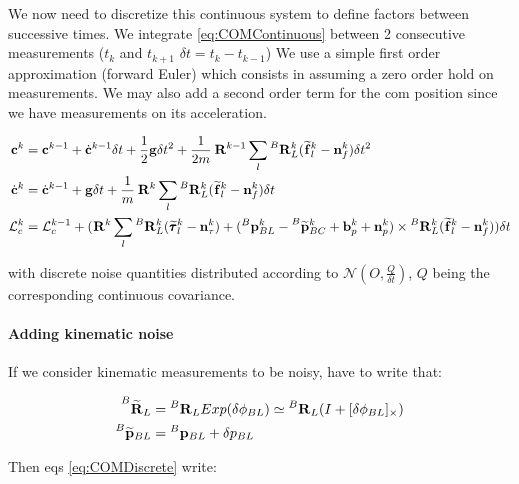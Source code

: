 \documentclass[11pt]{article}
\newcommand{\Rot}[2]{\prescript{#1}{}{\bfR}_{#2}}
\newcommand{\Rotm}[2]{\prescript{#1}{}{\widetilde{\bfR}}_{#2}}
\newcommand{\noise}{\bfn}
\newcommand{\bias}{\bfb}
\newcommand{\posi}[2]{\prescript{#1}{}{\bfp}_{#2}}
\newcommand{\posim}[2]{\prescript{#1}{}{\widetilde{\bfp}}_{#2}}
\newcommand{\forcem}[2]{\prescript{#1}{}{\widetilde{\bff}}_{#2}}
\newcommand{\torquem}[2]{\prescript{#1}{}{\widetilde{\pmb{\tau}}}_{#2}}
\newcommand{\AM}{\mathcal{L}}
\newcommand{\COM}{\bfc}
\newcommand{\COMd}{\dot{\bfc}}
\begin{document}
We now need to discretize this continuous system to define factors between successive times. We integrate \ref{eq:COMContinuous} between 2 consecutive measurements ($t_k$ and $t_{k+1}$ $\delta t = t_{k} - t_{k-1}$)  We use a simple first order approximation (forward Euler) which consists in assuming a zero order hold on measurements. We may also add a second order term for the com position since we have measurements on its acceleration.

\begin{equation}
\begin{split}
\COM^{k} &= \COM^{k-1} + \COMd^{k-1} \delta t 
+ \frac{1}{2} \bfg \delta t^2 + \frac{1}{2m} \Rot{}{}^{k-1} \sum_l \Rot{B}{L}^{k} (\forcem{}{l}^{k} - \noise_f^{k}) \delta t^2
\\
\COMd^{k}&= \COMd^{k-1} + \bfg \delta t + \frac{1}{m} \Rot{}{}^{k} \sum_l \Rot{B}{L}^{k} (\forcem{}{l}^{k} - \noise_f^{k}) \delta t 
\\
\AM_c^{k} &= \AM_c^{k-1} +  ( 
\Rot{}{}^{k}\sum_l \Rot{B}{L}^{k}(\torquem{}{l}^{k} - \noise_{\tau}^{k}) + (\posi{B}{BL}^{k} - \posim{B}{BC}^{k} + \bias_{p}^{k} + \noise_p^{k}) \times \Rot{B}{L}^{k}(\forcem{}{l}^{k} - \noise_f^{k}) 
) \delta t
\end{split}
\label{eq:COMDiscrete}
\end{equation}

with discrete noise quantities distributed according to \( \mathcal{N}(O,\frac{Q}{\delta t}) \), \(Q\) being the corresponding continuous covariance.

\paragraph{Adding kinematic noise}

If we consider kinematic measurements to be noisy, have to write that:

\begin{equation}
	\begin{split}
	\Rotm{B}{L} &= \Rot{B}{L} Exp(\delta \phi_{BL}) \simeq \Rot{B}{L} (I + [\delta \phi_{BL}]_{\times})
	\\
	\posim{B}{BL} &= \posi{B}{BL} + \delta p_{BL}
	\end{split}
\end{equation}

Then eqs \ref{eq:COMDiscrete} write:
\end{document}
